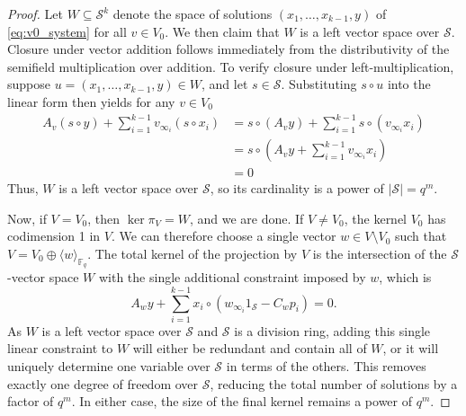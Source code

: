 \documentclass[10pt,a4paper]{amsart}
\renewcommand{\S}{\mathcal{S}}
\begin{document}
\begin{proof}
Let $W\subseteq \S^k$ denote the space of solutions $(x_1,\ldots,x_{k-1},y)$ of \eqref{eq:v0_system} for all $v\in V_0$. We then claim that $W$ is a left vector space over $\S$. Closure under vector addition follows immediately from the distributivity of the semifield multiplication over addition. To verify closure under left-multiplication, suppose $u=(x_1,\ldots,x_{k-1},y)\in W$, and let $s\in \S$. Substituting $s\circ u$ into the linear form then yields for any $v\in V_0$
\begin{align*}
    A_v(s\circ y) + \sum^{k-1}_{i=1}v_{\infty_i} (s\circ x_i) &= s\circ (A_v y) + \sum^{k-1}_{i=1} s\circ (v_{\infty_i} x_i) \\
    &= s\circ \left( A_v y + \sum^{k-1}_{i=1} v_{\infty_i} x_i\right) \\ &=0
\end{align*}
Thus, $W$ is a left vector space over $\S$, so its cardinality is a power of $|\S|=q^m$. 

Now, if $V = V_0$, then $\ker \pi_V = W$, and we are done. If $V \neq V_0$, the kernel $V_0$ has codimension 1 in $V$. We can therefore choose a single vector $w \in V \setminus V_0$ such that $V = V_0 \oplus \langle w \rangle_{\mathbb{F}_q}$. The total kernel of the projection by $V$ is the intersection of the $\S$-vector space $W$ with the single additional constraint imposed by $w$, which is
\[
    A_w y + \sum^{k-1}_{i=1} x_i \circ (w_{\infty_i} 1_\S - C_w p_i)=0.
\]
As $W$ is a left vector space over $\S$ and $\S$ is a division ring, adding this single linear constraint to $W$ will either be redundant and contain all of $W$, or it will uniquely determine one variable over $\S$ in terms of the others. This removes exactly one degree of freedom over $\S$, reducing the total number of solutions by a factor of $q^m$. In either case, the size of the final kernel remains a power of $q^m$.
\end{proof}
\end{document}
